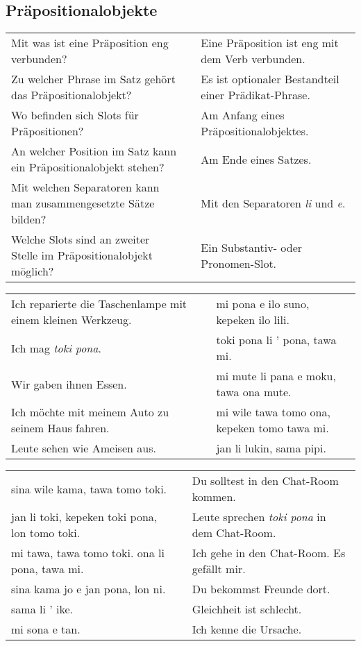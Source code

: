 \newpage
%
\subsection*{Präpositionalobjekte} 
\label{'prepositional_objects'}

\begin{supertabular}{p{5,5cm}|ll}
Mit was ist eine Präposition eng verbunden? && Eine Präposition ist eng mit dem Verb verbunden. \\ %
Zu welcher Phrase im Satz gehört das Präpositionalobjekt? && Es ist optionaler Bestandteil einer Prädikat-Phrase.  \\ %
Wo befinden sich Slots für Präpositionen? && Am Anfang eines Präpositionalobjektes. \\ %
An welcher Position im Satz kann ein Präpositionalobjekt stehen? && Am Ende eines Satzes. \\ %
Mit welchen Separatoren kann man zusammengesetzte Sätze bilden? && Mit den Separatoren \textit{li} und \textit{e}. \\ %
Welche Slots sind an zweiter Stelle im Präpositionalobjekt möglich? && Ein Substantiv- oder Pronomen-Slot. \\ %
\end{supertabular}

\begin{supertabular}{p{5,5cm}|ll}
Ich reparierte die Taschenlampe mit einem kleinen Werkzeug.  && mi pona e ilo suno, kepeken ilo lili. \\ %
Ich mag \textit{toki pona}.  && toki pona li ' pona, tawa mi. \\ %
Wir gaben ihnen Essen.  && mi mute li pana e moku, tawa ona mute. \\ %
Ich möchte mit meinem Auto zu seinem Haus fahren.  && mi wile tawa tomo ona, kepeken tomo tawa mi. \\ %
Leute sehen wie Ameisen aus.  && jan li lukin, sama pipi. \\ %
\end{supertabular}  

\begin{supertabular}{p{5,5cm}|ll}
sina wile kama, tawa tomo toki.  && Du solltest in den Chat-Room kommen. \\
jan li toki, kepeken toki pona, lon tomo toki.  && Leute sprechen \textit{toki pona} in dem Chat-Room. \\
mi tawa, tawa tomo toki. ona li pona, tawa mi.  && Ich gehe in den Chat-Room. Es gefällt mir. \\
sina kama jo e jan pona, lon ni.  && Du bekommst Freunde dort. \\
sama li ' ike. && Gleichheit ist schlecht. \\
mi sona e tan. && Ich kenne die Ursache. \\
\end{supertabular} 

